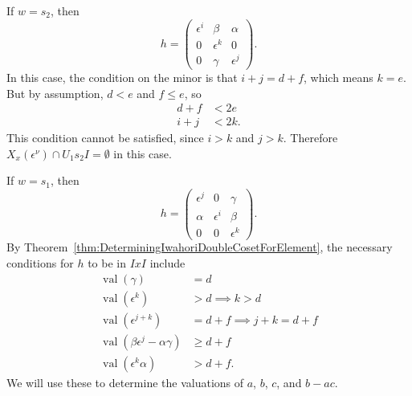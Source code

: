 \documentclass{amsart}
\theoremstyle{definition}
\def\e{\epsilon}
\def\val{\mathop{\mathrm{val}}}
\def\en{\e^{\nu}}
\def\X{X_x(\en)}
\begin{document}
  If $w = s_2$, then
  \begin{equation*}
    h = \begin{pmatrix}
      \e^i & \beta & \alpha \\
      0 & \e^k & 0 \\
      0 & \gamma & \e^j
    \end{pmatrix}.
  \end{equation*}
  In this case, the condition on the minor is that $i + j = d + f$, which means
  $k = e$.  But by assumption, $d < e$ and $f \le e$, so
  \begin{align*}
    d + f &< 2e \\
    i + j &< 2k.
  \end{align*}
  This condition cannot be satisfied, since $i > k$ and $j > k$.  Therefore $\X
  \cap U_1 s_2 I = \emptyset$ in this case.

  If $w = s_1$, then
  \begin{equation*}
    h = \begin{pmatrix}
      \e^j & 0 & \gamma \\
      \alpha & \e^i & \beta \\
      0 & 0 & \e^k
    \end{pmatrix}.
  \end{equation*}
  By Theorem~\ref{thm:DeterminingIwahoriDoubleCosetForElement}, the necessary
  conditions for $h$ to be in $IxI$ include
  \begin{align}
    \label{eq:2-e-max-d-min-val-gamma}
    \val(\gamma) &= d \\
    \label{eq:2-e-max-d-min-k-greater-d}
    \val(\e^k) &> d \implies k > d \\
    \label{eq:2-e-max-d-min-minor-equality}
    \val(\e^{j+k}) &= d + f \implies j + k = d + f \\
    \label{eq:2-e-max-d-min-val-minor}
    \val(\beta\e^j - \alpha\gamma) &\ge d + f\\
    \label{eq:2-e-max-d-min-val-alpha}
    \val(\e^k\alpha) &> d + f.
  \end{align}
  We will use these to determine the valuations of $a$, $b$, $c$, and $b - ac$.
\end{document}
